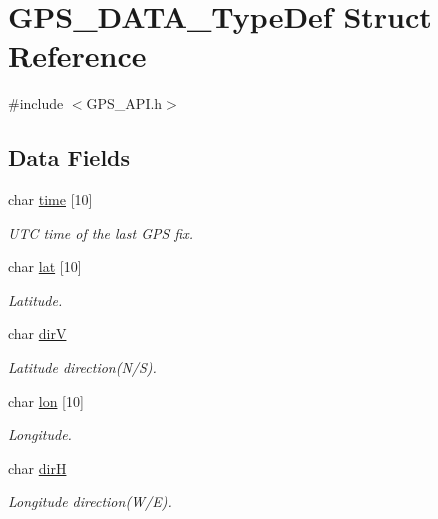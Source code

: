 \hypertarget{struct_g_p_s___d_a_t_a___type_def}{}\section{G\+P\+S\+\_\+\+D\+A\+T\+A\+\_\+\+Type\+Def Struct Reference}
\label{struct_g_p_s___d_a_t_a___type_def}


{\ttfamily \#include $<$G\+P\+S\+\_\+\+A\+P\+I.\+h$>$}

\subsection*{Data Fields}
\begin{DoxyCompactItemize}
\item 
char \hyperlink{struct_g_p_s___d_a_t_a___type_def_acfe1a576562a3b99956646b40367ab4f}{time} \mbox{[}10\mbox{]}
\begin{DoxyCompactList}\small\item\em U\+T\+C time of the last G\+P\+S fix. \end{DoxyCompactList}\item 
char \hyperlink{struct_g_p_s___d_a_t_a___type_def_ad150f6119d4692545e6250c4dd4d2787}{lat} \mbox{[}10\mbox{]}
\begin{DoxyCompactList}\small\item\em Latitude. \end{DoxyCompactList}\item 
char \hyperlink{struct_g_p_s___d_a_t_a___type_def_af855d9efd5ac010909e95f7b42bf18b9}{dir\+V}
\begin{DoxyCompactList}\small\item\em Latitude direction(N/\+S). \end{DoxyCompactList}\item 
char \hyperlink{struct_g_p_s___d_a_t_a___type_def_ad543e94eefa9567d8fda0dfc5f86b751}{lon} \mbox{[}10\mbox{]}
\begin{DoxyCompactList}\small\item\em Longitude. \end{DoxyCompactList}\item 
char \hyperlink{struct_g_p_s___d_a_t_a___type_def_aca18d828a46839fd589c9671c088197d}{dir\+H}
\begin{DoxyCompactList}\small\item\em Longitude direction(W/\+E). \end{DoxyCompactList}\item 

\end{DoxyCompactItemize}
